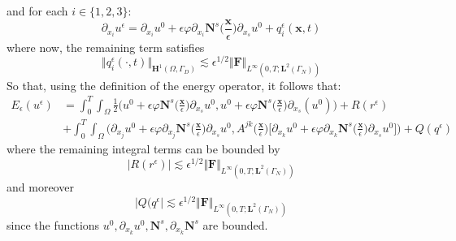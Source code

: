 and for each $i \in \{1,2,3\}$:
\begin{equation*}
    \partial_{x_i} u^{\epsilon} = \partial_{x_i} u^0 + \epsilon \varphi \partial_{x_i} \mathbf{N}^s \big( \frac{\mathbf{x}}{\epsilon} \big) \partial_{x_s} u^0 + q^{\epsilon}_i(\mathbf{x},t)
\end{equation*}
where now, the remaining term satisfies 
\begin{equation*}
    \Vert q^{\epsilon}_i(\cdot, t) \Vert_{\mathbf{H}^1(\Omega, \Gamma_D)} \lesssim \epsilon^{1/2} \Vert \mathbf{F}\Vert_{L^{\infty}(0,T; \mathbf{L}^{2}(\Gamma_N))}
\end{equation*}
So that, using the definition of the energy operator, it follows that:
\begin{align*}
    E_{\epsilon}(u^{\epsilon}) &= \int_0^T \int_{\Omega} \frac{1}{2}(u^0 + \epsilon \varphi \mathbf{N}^s \big( \frac{\mathbf{x}}{\epsilon} \big) \partial_{x_s} u^0, u^0 + \epsilon \varphi \mathbf{N}^s \big( \frac{\mathbf{x}}{\epsilon} \big) \partial_{x_s} (u^0) \big) + R(r^{\epsilon}) \\
    & + \int_0^T \int_{\Omega} \big( \partial_{x_j} u^0 + \epsilon \varphi \partial_{x_j} \mathbf{N}^s \big( \frac{\mathbf{x}}{\epsilon} \big) \partial_{x_s} u^0, A^{jk} \big(\frac{\mathbf{x}}{\epsilon} \big) \big[\partial_{x_k} u^0 + \epsilon \varphi \partial_{x_k} \mathbf{N}^s \big( \frac{\mathbf{x}}{\epsilon}\big) \partial_{x_s} u^0 \big] \big) + Q(q^{\epsilon})
\end{align*}
where the remaining integral terms can be bounded by
\begin{equation*}
    \vert R(r^{\epsilon}) \vert \lesssim \epsilon^{1/2} \Vert \mathbf{F}\Vert_{L^{\infty}(0,T;\mathbf{L}^{2}(\Gamma_N))} 
\end{equation*}
and moreover
\begin{equation*}
    \vert Q(q^{\epsilon} \vert \lesssim \epsilon^{1/2} \Vert \mathbf{F}\Vert_{L^{\infty}(0,T;\mathbf{L}^{2}(\Gamma_N))}
\end{equation*}
since the functions $u^0, \partial_{x_k}u^0, \mathbf{N}^s, \partial_{x_k} \mathbf{N}^s$ are bounded.


